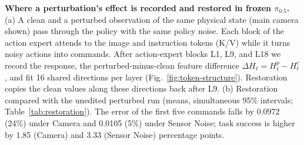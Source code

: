 \textbf{Where a perturbation's effect is recorded and restored in frozen $\pi_{0.5}$.}
(a) A clean and a perturbed observation of the same physical state (main camera shown) pass through the policy with the same policy noise. Each block of the action expert attends to the image and instruction tokens (K/V) while it turns noisy actions into commands. After action-expert blocks L1, L9, and L18 we record the response, the perturbed-minus-clean feature difference $\Delta H_\ell = H^{p}_\ell - H^{c}_\ell$, and fit 16 shared directions per layer (Fig.~\ref{fig:token-structure}). Restoration copies the clean values along these directions back after L9.
(b) Restoration compared with the unedited perturbed run (means, simultaneous 95\% intervals; Table~\ref{tab:restoration}). The error of the first five commands falls by 0.0972 (24\%) under Camera and 0.0105 (5\%) under Sensor Noise; task success is higher by 1.85 (Camera) and 3.33 (Sensor Noise) percentage points.
